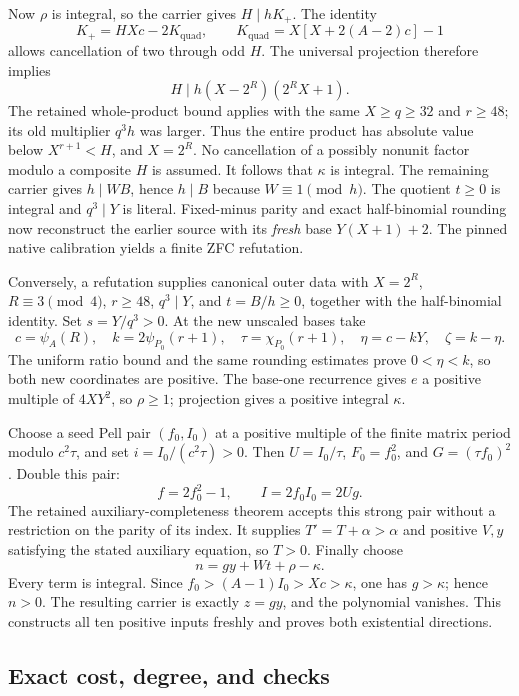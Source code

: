 Now $\rho$ is integral, so the carrier gives $H\mid hK_+$.
The identity
\[
 K_+=HXc-2K_{\mathrm{quad}},\qquad
 K_{\mathrm{quad}}=X[X+2(A-2)c]-1
\]
allows cancellation of two through odd $H$. The universal projection
therefore implies
\[
 H\mid h(X-2^R)(2^RX+1).
\]
The retained whole-product bound applies with the same $X\ge q\ge32$
and $r\ge48$; its old multiplier $q^3h$ was larger. Thus the entire
product has absolute value below $X^{r+1}<H$, and $X=2^R$.
No cancellation of a possibly nonunit factor modulo a composite $H$
is assumed. It follows that $\kappa$ is integral. The remaining carrier
gives $h\mid WB$, hence $h\mid B$ because $W\equiv1\pmod h$.
The quotient $t\ge0$ is integral and $q^3\mid Y$ is literal.
Fixed-minus parity and exact half-binomial rounding now reconstruct
the earlier source with its \emph{fresh} base $Y(X+1)+2$.
The pinned native calibration yields a finite ZFC refutation.

Conversely, a refutation supplies canonical outer data with
$X=2^R$, $R\equiv3\pmod4$, $r\ge48$, $q^3\mid Y$, and
$t=B/h\ge0$, together with the half-binomial identity. Set $s=Y/q^3>0$.
At the new unscaled bases take
\[
 c=\psi_A(R),\quad k=2\psi_{P_0}(r+1),\quad
 \tau=\chi_{P_0}(r+1),\quad
 \eta=c-kY,\quad\zeta=k-\eta.
\]
The uniform ratio bound and the same rounding estimates prove
$0<\eta<k$, so both new coordinates are positive.
The base-one recurrence gives $e$ a positive multiple of $4XY^2$,
so $\rho\ge1$; projection gives a positive integral $\kappa$.

Choose a seed Pell pair $(f_0,I_0)$ at a positive multiple of the
finite matrix period modulo $c^2\tau$, and set
$i=I_0/(c^2\tau)>0$. Then $U=I_0/\tau$, $F_0=f_0^2$, and
$G=(\tau f_0)^2$. Double this pair:
\[
 f=2f_0^2-1,\qquad I=2f_0I_0=2Ug.
\]
The retained auxiliary-completeness theorem accepts this strong
pair without a restriction on the parity of its index. It supplies
$T'=T+\alpha>\alpha$ and positive $V,y$ satisfying the stated auxiliary
equation, so $T>0$. Finally choose
\[
 n=gy+Wt+\rho-\kappa.
\]
Every term is integral. Since
$f_0>(A-1)I_0>Xc>\kappa$, one has $g>\kappa$; hence $n>0$.
The resulting carrier is exactly $z=gy$, and the polynomial vanishes.
This constructs all ten positive inputs freshly and proves both
existential directions.

\subsection{Exact cost, degree, and checks}

